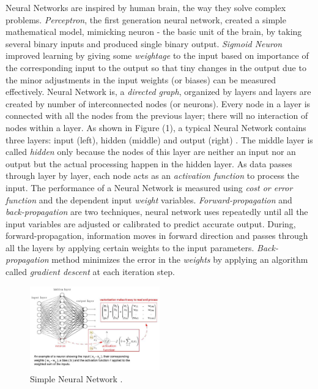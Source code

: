 \documentclass[sigconf]{acmart}
\begin{document}
	Neural Networks are inspired by human brain, the way they solve complex problems. {\em Perceptron}, the first generation neural network, created a simple mathematical model, mimicking neuron - the basic unit of the brain, by taking several binary inputs and produced single binary output. {\em Sigmoid Neuron} improved learning by giving some {\em weightage} to the input based on importance of the corresponding input to the output so that tiny changes in the output due to the minor adjustments in the input weights (or biases) can be measured effectively. Neural Network is, a {\em directed graph}, organized by layers and layers are created by number of interconnected nodes (or neurons). Every node in a layer is connected with all the nodes from the previous layer; there will no interaction of nodes within a layer. As shown in Figure (1), a typical Neural Network contains three layers: input (left), hidden (middle) and output (right) \cite{Goodfellow2016}. The middle layer is called {\em hidden} only because the nodes of this layer are neither an input nor an output but the actual processing happen in the hidden layer. As data passes through layer by layer, each node acts as an {\em activation function} to process the input. The performance of a Neural Network is measured using {\em cost or error function} and the dependent input {\em weight} variables. {\em Forward-propagation} and {\em back-propagation} are two techniques, neural network uses repeatedly until all the input variables are adjusted or calibrated to predict accurate output. During, forward-propagation, information moves in forward direction and passes through all the layers by applying certain weights to the input parameters. {\em Back-propagation} method minimizes the error in the {\em weights} by applying an algorithm called {\em gradient descent} at each iteration step. 	


	\begin{figure}
		\centering
		\includegraphics[width=0.5\textwidth]{images/neuralnetwork}
		\caption{Simple Neural Network \cite{Goodfellow2016, Gupta2017}.} \label{fig:figure1} 
	\end{figure}
\end{document}
